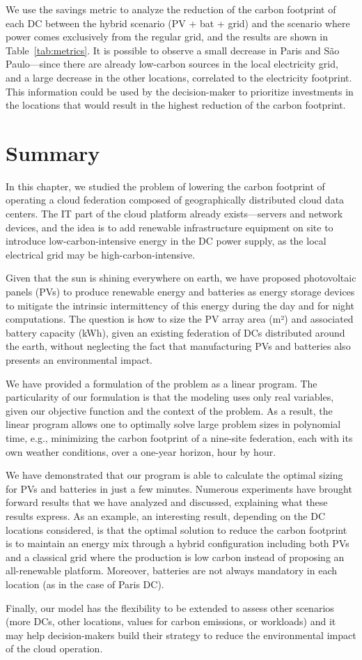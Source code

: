 We use the  savings metric to analyze the reduction of the carbon footprint of each DC between the hybrid scenario (PV + bat + grid) and the scenario where power comes exclusively from the regular grid, and the results are shown in Table~\ref{tab:metrics}. It is possible to observe a small decrease in Paris and S\~ao Paulo---since there are already low-carbon sources in the local electricity grid, and a large decrease in the other locations, correlated to the electricity footprint. This information could be used by the decision-maker to prioritize investments in the locations that would result in the highest reduction of the carbon footprint.

\section{Summary}
\label{sec:conclusion_ccgrid}

In this chapter, we studied the problem of lowering the carbon footprint of operating a cloud federation composed of geographically distributed cloud data centers. The IT part of the cloud platform already exists---servers and network devices, and the idea is to add renewable infrastructure equipment on site to introduce low-carbon-intensive energy in the DC power supply, as the local electrical grid may be high-carbon-intensive.

Given that the sun is shining everywhere on earth, we have proposed photovoltaic panels (PVs) to produce renewable energy and batteries as energy storage devices to mitigate the intrinsic intermittency of this energy during the day and for night computations. The question is how to size the PV array area (m²) and associated battery capacity (kWh), given an existing federation of DCs distributed around the earth, without neglecting the fact that manufacturing PVs and batteries also presents an environmental impact. 

We have provided a formulation of the problem as a linear program. The particularity of our formulation is that the modeling uses only real variables, given our objective function and the context of the problem. As a result, the linear program allows one to optimally solve large problem sizes in polynomial time, e.g., minimizing the carbon footprint of a nine-site federation, each with its own weather conditions, over a one-year horizon, hour by hour. 

We have demonstrated that our program is able to calculate the optimal sizing for PVs and batteries in just a few minutes. Numerous experiments have brought forward results that we have analyzed and discussed, explaining what these results express. As an example, an interesting result, depending on the DC locations considered, is that the optimal solution to reduce the carbon footprint is to maintain an energy mix through a hybrid configuration including both PVs and a classical grid where the production is low carbon instead of proposing an all-renewable platform. Moreover, batteries are not always mandatory in each location (as in the case of Paris DC). 

Finally, our model has the flexibility to be extended to assess other scenarios (more DCs, other locations, values for carbon emissions, or workloads) and it may help decision-makers build their strategy to reduce the environmental impact of the cloud operation.

